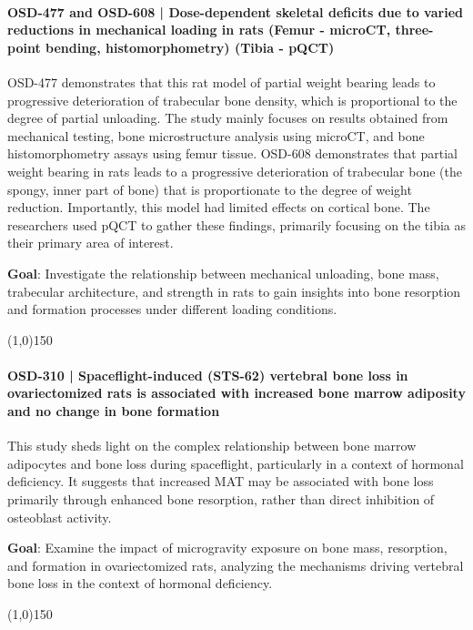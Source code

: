 \documentclass{article}
\begin{document}
\paragraph{OSD-477 and OSD-608 | Dose-dependent skeletal deficits due to varied reductions in mechanical loading in rats (Femur - microCT, three-point bending, histomorphometry) (Tibia - pQCT)}
OSD-477 demonstrates that this rat model of partial weight bearing leads to progressive deterioration of trabecular bone density, which is proportional to the degree of partial unloading. The study mainly focuses on results obtained from mechanical testing, bone microstructure analysis using microCT, and bone histomorphometry assays using femur tissue.
OSD-608 demonstrates that partial weight bearing in rats leads to a progressive deterioration of trabecular bone (the spongy, inner part of bone) that is proportionate to the degree of weight reduction. Importantly, this model had limited effects on cortical bone. The researchers used pQCT to gather these findings, primarily focusing on the tibia as their primary area of interest.

\quad\quad\textbf{Goal}: Investigate the relationship between mechanical unloading, bone mass, trabecular architecture, and strength in rats to gain insights into bone resorption and formation processes under different loading conditions.

\begin{center}
  \line(1,0){150}
\end{center}

\paragraph{OSD-310 | Spaceflight-induced (STS-62) vertebral bone loss in ovariectomized rats is associated with increased bone marrow adiposity and no change in bone formation}
This study sheds light on the complex relationship between bone marrow adipocytes and bone loss during spaceflight, particularly in a context of hormonal deficiency. It suggests that increased MAT may be associated with bone loss primarily through enhanced bone resorption, rather than direct inhibition of osteoblast activity.

\quad\quad\textbf{Goal}: Examine the impact of microgravity exposure on bone mass, resorption, and formation in ovariectomized rats, analyzing the mechanisms driving vertebral bone loss in the context of hormonal deficiency.

\begin{center}
  \line(1,0){150}
\end{center}
\end{document}

